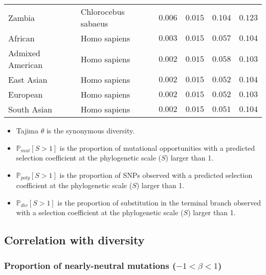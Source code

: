 \documentclass{article}
\newcommand{\Sphy}{S}
\newcommand{\Spop}{\beta}
\newcommand{\polyNeutral}{-1 < \Spop < 1}
\begin{document}
\begin{center}
\begin{longtable}{|l|l|r|r|r|r|}
            Zambia               & Chlorocebus sabaeus & $ 0.006$              & $ 0.015$                & $ 0.104$                 & $ 0.123$                \\
            African              & Homo sapiens        & $ 0.003$              & $ 0.015$                & $ 0.057$                 & $ 0.104$                \\
            Admixed American     & Homo sapiens        & $ 0.002$              & $ 0.015$                & $ 0.058$                 & $ 0.103$                \\
            East Asian           & Homo sapiens        & $ 0.002$              & $ 0.015$                & $ 0.052$                 & $ 0.104$                \\
            European             & Homo sapiens        & $ 0.002$              & $ 0.015$                & $ 0.052$                 & $ 0.103$                \\
            South Asian          & Homo sapiens        & $ 0.002$              & $ 0.015$                & $ 0.051$                 & $ 0.104$                \\
        \end{longtable}
    \end{center}
    \begin{itemize}
        \item Tajima $\theta$ is the synonymous diversity.
        \item $\mathbb{P}_{mut}[S>1]$ is the proportion of mutational opportunities with a predicted selection coefficient at the phylogenetic scale ($\Sphy$) larger than 1.
        \item $\mathbb{P}_{poly}[S>1]$ is the proportion of SNPs observed with a predicted selection coefficient at the phylogenetic scale ($\Sphy$) larger than 1.
        \item $\mathbb{P}_{div}[S>1]$ is the proportion of substitution in the terminal branch observed with a selection coefficient at the phylogenetic scale ($\Sphy$) larger than 1.
    \end{itemize}

    \subsection{Correlation with diversity}

    \subsubsection{Proportion of nearly-neutral mutations ($\polyNeutral$)}
\end{document}

